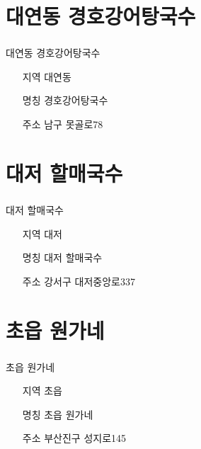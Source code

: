 \documentclass[aspectratio=1610,17pt,xcolor=pdftex,dvipsnames,table,handout]{beamer}
\begin{document}
		\section{ 대연동 경호강어탕국수	}
		\begin{frame} [t,plain]
		\frametitle{ }
			\begin{block} {대연동 경호강어탕국수	}
			\setlength{\leftmargini}{4em}			
			\begin{itemize}
				\item [지역] 대연동	
				\item [명칭] 경호강어탕국수	
				\item [주소] 남구 못골로78
			\end{itemize}
			\end{block}						
		\end{frame}						


		\section{ 대저 할매국수	}
		\begin{frame} [t,plain]
		\frametitle{ }
			\begin{block} {대저 할매국수	}
			\setlength{\leftmargini}{4em}			
			\begin{itemize}
				\item [지역] 대저	
				\item [명칭] 대저 할매국수	
				\item [주소] 강서구 대저중앙로337
			\end{itemize}
			\end{block}						
		\end{frame}						


		\section{ 초읍 원가네	}
		\begin{frame} [t,plain]
		\frametitle{ }
			\begin{block} {초읍 원가네	}
			\setlength{\leftmargini}{4em}			
			\begin{itemize}
				\item [지역] 초읍	
				\item [명칭] 초읍 원가네	
				\item [주소] 부산진구 성지로145
			\end{itemize}
			\end{block}						
		\end{frame}						
\end{document}
